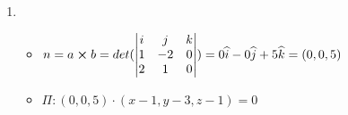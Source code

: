 \documentclass[../practica_01.tex]{subfiles}
\begin{document}
\begin{enumerate}
        \item 
            \begin{itemize}
                \item $ n = a \crossproduct b = det(\begin{vmatrix}
                        i & j  & k \\
                        1 & -2 & 0 \\
                        2 & 1  & 0 \\
                    \end{vmatrix}) = 0\widehat{i} - 0\widehat{j} + 5\widehat{k} = (0,0,5)$

                \item $ \Pi: (0,0,5) \cdot (x-1,y-3,z-1) = 0 $
            \end{itemize}

    \end{enumerate}
\end{document}
